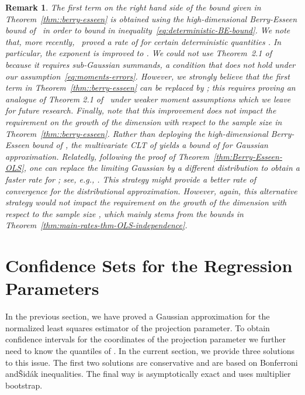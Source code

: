 \documentclass{article}
\newtheorem{remark}{Remark}
\begin{document}
\begin{remark}
The first term on the right hand side of the bound given in Theorem~\ref{thm::berry-esseen} is obtained using the high-dimensional Berry-Esseen bound of~\cite{koike2019notes} in order to bound   in inequality~\eqref{eq:deterministic-BE-bound}.
We note that, more recently,~\citet{chernozhukov2019improved} proved a rate of   for certain deterministic quantities
 .
In particular, the exponent   is improved to  . We could not use Theorem~2.1 of~\cite{chernozhukov2019improved} because it requires sub-Gaussian summands, a condition that does not hold under our assumption~\ref{eq:moments-errors}. However, we strongly believe that the first term in Theorem~\ref{thm::berry-esseen} can be replaced by  ; this requires proving an analogue of Theorem 2.1 of~\cite{chernozhukov2019improved} under weaker moment assumptions which we leave for future research. Finally, note that this improvement does not impact the requirement on the growth of the dimension   with respect to the sample size   in Theorem~\ref{thm::berry-esseen}.
Rather than deploying the high-dimensional Berry-Esseen bound of \cite{koike2019notes}, the multivariate CLT of \cite{raivc2019multivariate} yields a bound of   for Gaussian approximation. Relatedly, following the proof of Theorem~\ref{thm:Berry-Esseen-OLS}, one can replace the limiting Gaussian by a different distribution to obtain a faster rate for  ; see, e.g., \cite{zhilova2016non}. This strategy might provide a better rate of convergence for the distributional approximation. However, again, this alternative strategy would not impact the requirement on the growth of the dimension   with respect to the sample size  , which mainly stems from the bounds in Theorem~\ref{thm:main-rates-thm-OLS-independence}.
\end{remark}
\section{Confidence Sets for the Regression Parameters}\label{sec::confidence-sets-OLS}
In the previous section, we have proved a Gaussian approximation for the normalized least squares estimator of the projection parameter. To obtain confidence intervals for the coordinates of the projection parameter we further need to know the quantiles of  . In the current section, we provide three solutions to this issue. The first two solutions are conservative and are based on Bonferroni and{\v{S}}id{\'a}k inequalities. The final way is asymptotically exact and uses multiplier bootstrap.
\end{document}
